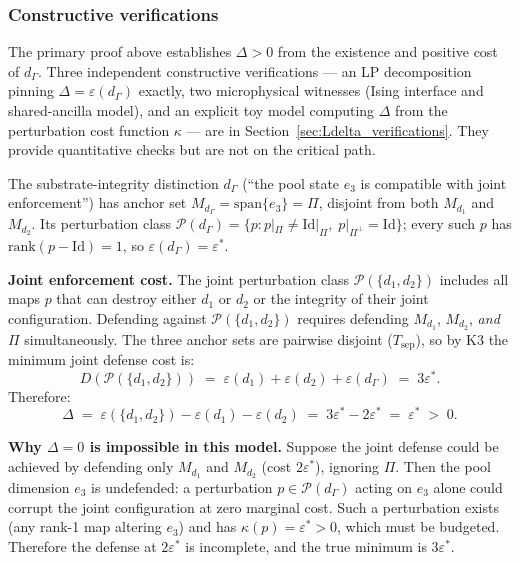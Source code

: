 \documentclass[11pt]{article}
\theoremstyle{remark}
\begin{document}
\subsubsection*{Constructive verifications}

The primary proof above establishes $\Delta > 0$ from the existence and positive cost of $d_\Gamma$.  Three independent constructive verifications --- an LP decomposition pinning $\Delta = \varepsilon(d_\Gamma)$ exactly, two microphysical witnesses (Ising interface and shared-ancilla model), and an explicit toy model computing $\Delta$ from the perturbation cost function $\kappa$ --- are in Section~\ref{sec:Ldelta_verifications}.  They provide quantitative checks but are not on the critical path.

The substrate-integrity distinction $d_\Gamma$ (``the pool state $e_3$ is compatible with joint enforcement'') has anchor set $M_{d_\Gamma} = \mathrm{span}\{e_3\} = \Pi$, disjoint from both $M_{d_1}$ and $M_{d_2}$.  Its perturbation class $\mathcal{P}(d_\Gamma) = \{p : p|_\Pi \ne \mathrm{Id}|_\Pi,\; p|_{\Pi^\perp} = \mathrm{Id}\}$; every such $p$ has $\mathrm{rank}(p - \mathrm{Id}) = 1$, so $\varepsilon(d_\Gamma) = \varepsilon^*$.

\smallskip\noindent\textbf{Joint enforcement cost.}  The joint perturbation class $\mathcal{P}(\{d_1, d_2\})$ includes all maps $p$ that can destroy either $d_1$ or $d_2$ or the integrity of their joint configuration.  Defending against $\mathcal{P}(\{d_1, d_2\})$ requires defending $M_{d_1}$, $M_{d_2}$, \emph{and} $\Pi$ simultaneously.  The three anchor sets are pairwise disjoint ($T_{\mathrm{sep}}$), so by K3 the minimum joint defense cost is:
\[
D(\mathcal{P}(\{d_1,d_2\})) \;=\; \varepsilon(d_1) + \varepsilon(d_2) + \varepsilon(d_\Gamma) \;=\; 3\varepsilon^*.
\]
Therefore:
\[
\Delta \;=\; \varepsilon(\{d_1,d_2\}) - \varepsilon(d_1) - \varepsilon(d_2) \;=\; 3\varepsilon^* - 2\varepsilon^* \;=\; \varepsilon^* \;>\; 0.
\]

\smallskip\noindent\textbf{Why $\Delta = 0$ is impossible in this model.}  Suppose the joint defense could be achieved by defending only $M_{d_1}$ and $M_{d_2}$ (cost $2\varepsilon^*$), ignoring $\Pi$.  Then the pool dimension $e_3$ is undefended: a perturbation $p \in \mathcal{P}(d_\Gamma)$ acting on $e_3$ alone could corrupt the joint configuration at zero marginal cost.  Such a perturbation exists (any rank-1 map altering $e_3$) and has $\kappa(p) = \varepsilon^* > 0$, which must be budgeted.  Therefore the defense at $2\varepsilon^*$ is incomplete, and the true minimum is $3\varepsilon^*$.
\end{document}
